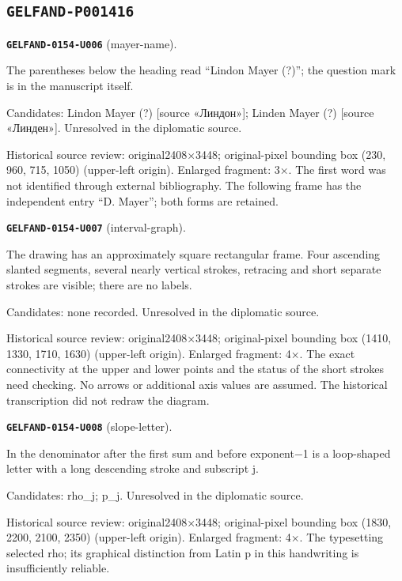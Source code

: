 \subsection*{\texttt{GELFAND-P001416}}
\par\noindent\leavevmode{}\label{GELFAND-0154-U006}\textbf{\texttt{GELFAND-0154-U006}} (mayer-name).\nopagebreak[4]\par
The parentheses below the heading read “Lindon Mayer (?)”; the question mark is in the manuscript itself.\par
Candidates: Lindon Mayer (?) [source «Линдон»]; Linden Mayer (?) [source «Линден»]. Unresolved in the diplomatic source.\par
Historical source review: original2408×3448; original-pixel bounding box (230, 960, 715, 1050) (upper-left origin). Enlarged fragment: 3×. The first word was not identified through external bibliography. The following frame has the independent entry “D. Mayer”; both forms are retained.\par\medskip
\par\noindent\leavevmode{}\label{GELFAND-0154-U007}\textbf{\texttt{GELFAND-0154-U007}} (interval-graph).\nopagebreak[4]\par
The drawing has an approximately square rectangular frame. Four ascending slanted segments, several nearly vertical strokes, retracing and short separate strokes are visible; there are no labels.\par
Candidates: none recorded. Unresolved in the diplomatic source.\par
Historical source review: original2408×3448; original-pixel bounding box (1410, 1330, 1710, 1630) (upper-left origin). Enlarged fragment: 4×. The exact connectivity at the upper and lower points and the status of the short strokes need checking. No arrows or additional axis values are assumed. The historical transcription did not redraw the diagram.\par\medskip
\par\noindent\leavevmode{}\label{GELFAND-0154-U008}\textbf{\texttt{GELFAND-0154-U008}} (slope-letter).\nopagebreak[4]\par
In the denominator after the first sum and before exponent−1 is a loop-shaped letter with a long descending stroke and subscript j.\par
Candidates: rho\_j; p\_j. Unresolved in the diplomatic source.\par
Historical source review: original2408×3448; original-pixel bounding box (1830, 2200, 2100, 2350) (upper-left origin). Enlarged fragment: 4×. The typesetting selected rho; its graphical distinction from Latin p in this handwriting is insufficiently reliable.\par\medskip
